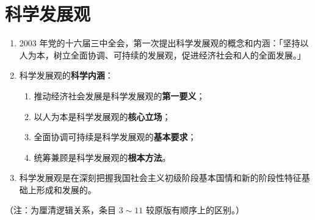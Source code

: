 \documentclass[UTF8]{ctexart}
\newcommand\Emph[2]{\colorbox{c#1-light}{\textcolor{c#1-emph}{\textbf{#2}}}}
\begin{document}
\section{科学发展观}\label{sec:8}
\begin{enumerate}[start=1]
  \item 2003 年党的十六届三中全会，第一次提出科学发展观的概念和内涵：「坚持以人为本，树立全面协调、可持续的发展观，促进经济社会和人的全面发展。」
  \item 科学发展观的\Emph{8}{科学内涵}：
  \begin{enumerate}[label={\roman{enumii})}, start=1]
    \item 推动经济社会发展是科学发展观的\Emph{8}{第一要义}；
    \item 以人为本是科学发展观的\Emph{8}{核心立场}；
    \item 全面协调可持续是科学发展观的\Emph{8}{基本要求}；
    \item 统筹兼顾是科学发展观的\Emph{8}{根本方法}。
  \end{enumerate}
  \item 科学发展观是在深刻把握我国社会主义初级阶段基本国情和新的阶段性特征基础上形成和发展的。
\end{enumerate}

\textcolor{c8-emph}{（注：为厘清逻辑关系，条目 $3\sim 11$ 较原版有顺序上的区别。）}
\end{document}
